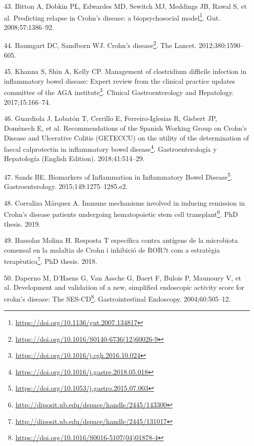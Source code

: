 \documentclass[
  12pt,
  a4paper,
  twoside,
  openright]{book}
\DeclareRobustCommand{\href}[2]{#2\footnote{\url{#1}}}
\newlength{\cslhangindent}
\newlength{\cslentryspacingunit} %
\newenvironment{CSLReferences}[2] %
 {%
  \setlength{\parindent}{0pt}
  \ifodd #1
  \let\oldpar\par
  \def\par{\hangindent=\cslhangindent\oldpar}
  \fi
  \setlength{\parskip}{#2\cslentryspacingunit}
 }%
 {}
\begin{document}
\begin{CSLReferences}{0}{0}
\leavevmode{}%
43. Bitton A, Dobkin PL, Edwardes MD, Sewitch MJ, Meddings JB, Rawal S, et al. \href{https://doi.org/10.1136/gut.2007.134817}{Predicting relapse in Crohn's disease: a biopsychosocial model}. Gut. 2008;57:1386--92.

\leavevmode{}%
44. Baumgart DC, Sandborn WJ. \href{https://doi.org/10.1016/S0140-6736(12)60026-9}{Crohn's disease}. The Lancet. 2012;380:1590--605.

\leavevmode{}%
45. Khanna S, Shin A, Kelly CP. \href{https://doi.org/10.1016/j.cgh.2016.10.024}{Management of clostridium difficile infection in inflammatory bowel disease: Expert review from the clinical practice updates committee of the AGA institute}. Clinical Gastroenterology and Hepatology. 2017;15:166--74.

\leavevmode{}%
46. Guardiola J, Lobatón T, Cerrillo E, Ferreiro-Iglesias R, Gisbert JP, Domènech E, et al. \href{https://doi.org/10.1016/j.gastre.2018.05.018}{Recommendations of the Spanish Working Group on Crohn's Disease and Ulcerative Colitis (GETECCU) on the utility of the determination of faecal calprotectin in inflammatory bowel disease}. Gastroenterología y Hepatología (English Edition). 2018;41:514--29.

\leavevmode{}%
47. Sands BE. \href{https://doi.org/10.1053/j.gastro.2015.07.003}{Biomarkers of Inflammation in Inflammatory Bowel Disease}. Gastroenterology. 2015;149:1275--1285.e2.

\leavevmode{}%
48. Corraliza Márquez A. \href{http://diposit.ub.edu/dspace/handle/2445/143300}{Immune mechanisms involved in inducing remission in Crohn{'}s disease patients undergoing hematopoietic stem cell transplant}. PhD thesis. 2019.

\leavevmode{}%
49. Bassolas Molina H. \href{http://diposit.ub.edu/dspace/handle/2445/131017}{Resposta T específica contra antígens de la microbiota comensal en la malaltia de Crohn i inhibició de ROR?t com a estratègia terapèutica}. PhD thesis. 2018.

\leavevmode{}%
50. Daperno M, D'Haens G, Van Assche G, Baert F, Bulois P, Maunoury V, et al. \href{https://doi.org/10.1016/S0016-5107(04)01878-4}{Development and validation of a new, simplified endoscopic activity score for crohn's disease: The SES-CD}. Gastrointestinal Endoscopy. 2004;60:505--12.


\end{CSLReferences}
\end{document}
